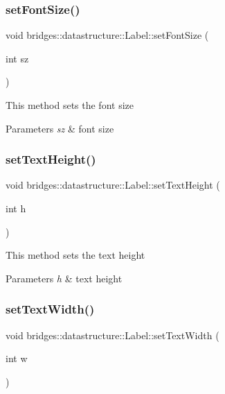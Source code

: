 \subsubsection{\texorpdfstring{setFontSize()}{setFontSize()}}
{\footnotesize\ttfamily void bridges\+::datastructure\+::\+Label\+::set\+Font\+Size (\begin{DoxyParamCaption}\item[{int}]{sz }\end{DoxyParamCaption})\hspace{0.3cm}{\ttfamily [inline]}}

This method sets the font size


\begin{DoxyParams}{Parameters}
{\em sz} & font size \\
\hline
\end{DoxyParams}
\mbox{\label{classbridges_1_1datastructure_1_1_label_acd095180b94bad422f7c26182680a958}} 
\subsubsection{\texorpdfstring{setTextHeight()}{setTextHeight()}}
{\footnotesize\ttfamily void bridges\+::datastructure\+::\+Label\+::set\+Text\+Height (\begin{DoxyParamCaption}\item[{int}]{h }\end{DoxyParamCaption})\hspace{0.3cm}{\ttfamily [inline]}}

This method sets the text height


\begin{DoxyParams}{Parameters}
{\em h} & text height \\
\hline
\end{DoxyParams}
\mbox{\label{classbridges_1_1datastructure_1_1_label_a323af06f4536c644d6cc265b332b6ad0}} 
\subsubsection{\texorpdfstring{setTextWidth()}{setTextWidth()}}
{\footnotesize\ttfamily void bridges\+::datastructure\+::\+Label\+::set\+Text\+Width (\begin{DoxyParamCaption}\item[{int}]{w }\end{DoxyParamCaption})\hspace{0.3cm}{\ttfamily [inline]}}

